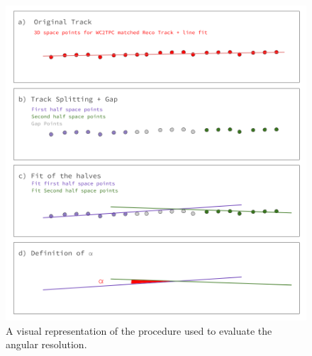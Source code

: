 \begin{figure}[ht]
\begin{minipage}[t]{0.45\linewidth}
\centering
\includegraphics[width=\textwidth]{Chapter-5/Images/TrackingProcedure.png}
\caption{A visual representation of the procedure used to evaluate the angular resolution.}
\label{fig:AngResProcedure}
\end{minipage}
\hspace{0.5cm}
\begin{minipage}[t]{0.45\linewidth}
\centering

\end{minipage}
\end{figure}
